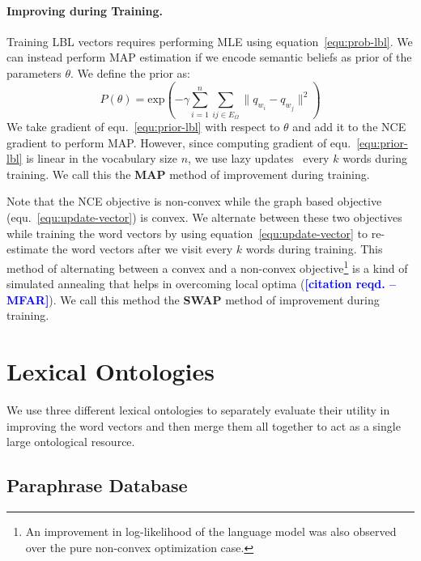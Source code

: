 \documentclass[11pt]{article}
\newcommand{\mfar}[1]{\textcolor{blue}{\bf\small [#1 --MFAR]}}
\begin{document}
\paragraph{Improving during Training.} Training LBL vectors requires performing MLE 
using equation~\ref{equ:prob-lbl}. We can instead perform MAP estimation
if we encode semantic beliefs as prior of the parameters $\theta$. We define the prior
as:
\begin{equation}
  \label{equ:prior-lbl}
  P(\theta) = \text{exp}(-\gamma\sum_{i=1}^{n}\sum_{ij \in E_{\Omega}}\lVert q_{w_i}-q_{w_j} \rVert^{2})
\end{equation}
We take gradient of equ.~\ref{equ:prior-lbl} with respect to $\theta$ and add it to the 
NCE gradient to perform MAP. However, since computing gradient of equ.~\ref{equ:prior-lbl}
is linear in the vocabulary size $n$, we use lazy updates~\cite{Carpenter08lazysparse} every
$k$ words during training. We call this the \textbf{MAP} method of improvement during training.

Note that the NCE objective is non-convex while the graph based objective (equ.~\ref{equ:update-vector}) is 
convex. We alternate between these two objectives while training the word vectors by
using equation~\ref{equ:update-vector} to re-estimate the word vectors after we visit every 
$k$ words during training. This method of alternating between a convex and a non-convex
objective\footnote{An improvement in log-likelihood of the language model was also observed over the 
pure non-convex optimization case.} is a kind of simulated annealing that helps in overcoming 
local optima (\mfar{citation reqd.}). We call this method the \textbf{SWAP} method of improvement during training.

\section{Lexical Ontologies}
\label{sec:onto}

We use three different lexical ontologies to separately evaluate their utility in improving
the word vectors and then merge them all together to act as a single large ontological resource.

\subsection{Paraphrase Database} 
\label{sec:ppdb}
\end{document}
